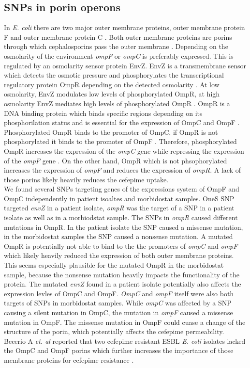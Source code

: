 \subsection{SNPs in porin operons}
In \textit{E. coli} there are two major outer membrane proteins, outer membrane protein F and outer membrane protein C \cite{rampersaud_ompr_1994}. Both outer membrane proteins are porins through which cephalosporins pass the outer membrane \cite{masi_structure_2013}. Depending on the osmolarity of the environment \textit{ompF} or \textit{ompC} is preferably expressed. This is regulated by an osmolarity sensor protein EnvZ. EnvZ is a transmembrane sensor which detects the osmotic pressure and phosphorylates the transcriptional regulatory protein OmpR depending on the detected osmolarity \cite{rampersaud_ompr_1994}. At low osmolarity, EnvZ modulates low levels of phosphorylated OmpR, at high osmolarity EnvZ mediates high levels of phosphorylated OmpR \cite{rampersaud_ompr_1994}. OmpR is a DNA binding protein which binds specific regions depending on its phosphorilation status and is essential for the expression of OmpC and OmpF \cite{rampersaud_ompr_1994}. Phosphorylated OmpR binds to the promoter of OmpC, if OmpR is not phosphorylated it binds to the promoter of OmpF \cite{rampersaud_ompr_1994}. Therefore, phosphorylated OmpR increases the expression of the \textit{ompC} gene while repressing the expression of the \textit{ompF} gene \cite{rampersaud_ompr_1994}. On the other hand, OmpR which is not phsophorylated increases the expression of \textit{ompF} and reduces the expression of \textit{ompR}. A lack of those porins likely heavily reduces the cefepime uptake. \\
We found several SNPs targeting genes of the expressions system of OmpF and OmpC independently in patient isoaltes and morbidostat samples. OneS SNP targeted \textit{envZ} in a patient isolate, \textit{ompR} was the target of a SNP in a patient isolate as well as in a morbiodstat sample. The SNPs in \textit{ompR} caused different mutations in OmpR. In the patient isolate the SNP caused a missense mutation, in the morbidostat samples the SNP caused a nonsense mutation. A mutated OmpR is potentially not able to bind to the the promoters of \textit{ompC} and \textit{ompF} which likely heavily reduced the expression of both outer membrane proteins. This seems especially plausible for the mutated OmpR in the morbidostat sample, because the nonsense mutation heavily impacts the functionality of the protein. The mutated \textit{envZ} found in a patient isolate potentially also affects the expression levles of OmpC and OmpF. \textit{OmpC} and \textit{ompF} itself were also both targets of SNPs in morbidostat samples. While \textit{ompC} was affected by a SNP causing a silent mutation in OmpC, the mutation in \textit{ompF} caused a missense mutation in OmpF. The missense mutation in OmpF could cuase a change of the structure of the porin, which potentially affects the cefepime permeability. Becerio A \textit{et. al} reported that two cefepime resistant ESBL \textit{E. coli} isolates lacked the OmpC and OmpF porins which further increases the importance of those membrane proteins for cefepime resistance \cite{beceiro_false_2011}. \\
